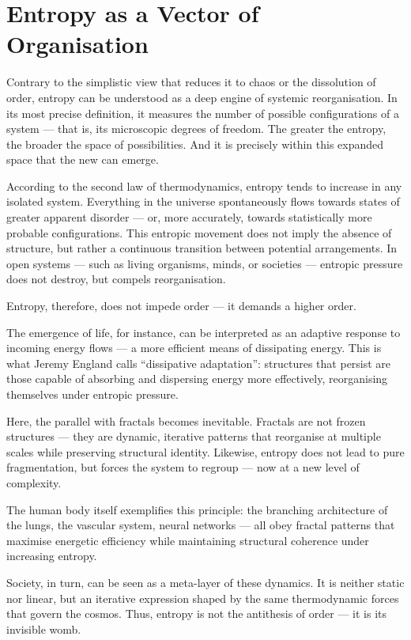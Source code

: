 \section{Entropy as a Vector of Organisation}

Contrary to the simplistic view that reduces it to chaos or the dissolution of order, entropy can be understood as a deep engine of systemic reorganisation. In its most precise definition, it measures the number of possible configurations of a system — that is, its microscopic degrees of freedom. The greater the entropy, the broader the space of possibilities. And it is precisely within this expanded space that the new can emerge.

According to the second law of thermodynamics, entropy tends to increase in any isolated system. Everything in the universe spontaneously flows towards states of greater apparent disorder — or, more accurately, towards statistically more probable configurations. This entropic movement does not imply the absence of structure, but rather a continuous transition between potential arrangements. In open systems — such as living organisms, minds, or societies — entropic pressure does not destroy, but compels reorganisation.

Entropy, therefore, does not impede order — it demands a higher order.

The emergence of life, for instance, can be interpreted as an adaptive response to incoming energy flows — a more efficient means of dissipating energy. This is what Jeremy England calls “dissipative adaptation”: structures that persist are those capable of absorbing and dispersing energy more effectively, reorganising themselves under entropic pressure.

Here, the parallel with fractals becomes inevitable. Fractals are not frozen structures — they are dynamic, iterative patterns that reorganise at multiple scales while preserving structural identity. Likewise, entropy does not lead to pure fragmentation, but forces the system to regroup — now at a new level of complexity.

The human body itself exemplifies this principle: the branching architecture of the lungs, the vascular system, neural networks — all obey fractal patterns that maximise energetic efficiency while maintaining structural coherence under increasing entropy.

Society, in turn, can be seen as a meta-layer of these dynamics. It is neither static nor linear, but an iterative expression shaped by the same thermodynamic forces that govern the cosmos. Thus, entropy is not the antithesis of order — it is its invisible womb.
